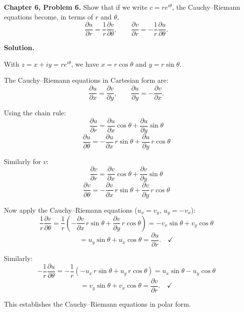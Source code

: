 \documentclass[12pt]{article}
\begin{document}
\textbf{Chapter 6, Problem 6.} Show that if we write $c = re^{i\theta}$, the Cauchy--Riemann equations become, in terms of $r$ and $\theta$,
\[
\frac{\partial u}{\partial r} = \frac{1}{r}\frac{\partial v}{\partial \theta}, \qquad \frac{\partial v}{\partial r} = -\frac{1}{r}\frac{\partial u}{\partial \theta}.
\]

\bigskip
\textbf{Solution.}

With $z = x + iy = re^{i\theta}$, we have $x = r\cos\theta$ and $y = r\sin\theta$.

The Cauchy--Riemann equations in Cartesian form are:
\[
\frac{\partial u}{\partial x} = \frac{\partial v}{\partial y}, \qquad \frac{\partial u}{\partial y} = -\frac{\partial v}{\partial x}.
\]

Using the chain rule:
\[
\frac{\partial u}{\partial r} = \frac{\partial u}{\partial x}\cos\theta + \frac{\partial u}{\partial y}\sin\theta
\]
\[
\frac{\partial u}{\partial \theta} = -\frac{\partial u}{\partial x}\,r\sin\theta + \frac{\partial u}{\partial y}\,r\cos\theta
\]

Similarly for $v$:
\[
\frac{\partial v}{\partial r} = \frac{\partial v}{\partial x}\cos\theta + \frac{\partial v}{\partial y}\sin\theta
\]
\[
\frac{\partial v}{\partial \theta} = -\frac{\partial v}{\partial x}\,r\sin\theta + \frac{\partial v}{\partial y}\,r\cos\theta
\]

Now apply the Cauchy--Riemann equations ($u_x = v_y$, $u_y = -v_x$):
\[
\frac{1}{r}\frac{\partial v}{\partial \theta} = \frac{1}{r}\left(-\frac{\partial v}{\partial x}\,r\sin\theta + \frac{\partial v}{\partial y}\,r\cos\theta\right) = -v_x\sin\theta + v_y\cos\theta
\]
\[
= u_y\sin\theta + u_x\cos\theta = \frac{\partial u}{\partial r}. \quad \checkmark
\]

Similarly:
\[
-\frac{1}{r}\frac{\partial u}{\partial \theta} = -\frac{1}{r}\left(-u_x\,r\sin\theta + u_y\,r\cos\theta\right) = u_x\sin\theta - u_y\cos\theta
\]
\[
= v_y\sin\theta + v_x\cos\theta = \frac{\partial v}{\partial r}. \quad \checkmark
\]

This establishes the Cauchy--Riemann equations in polar form.
\end{document}
